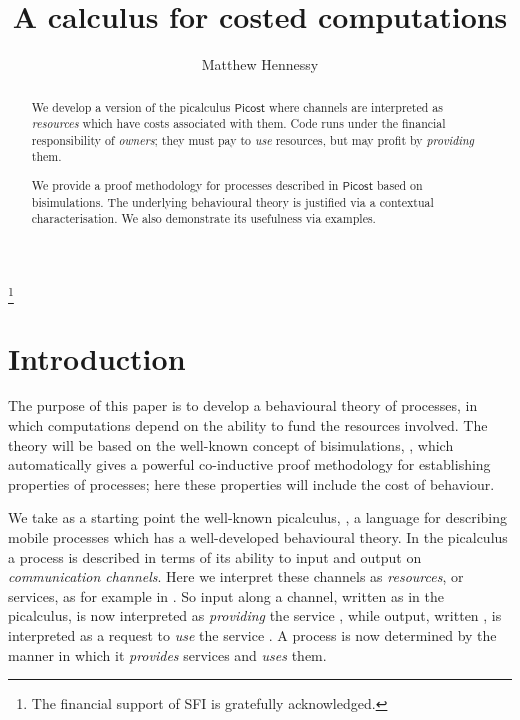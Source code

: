 \documentclass{LMCS}
\newcommand{\pfn}[1]{\mathsf{#1}}  \newcommand{\cfn}[1]{\mathsf{#1}}  \newcommand{\ownfnt}[1]{{\mathsf{#1}}}
\newcommand{\picost}{\ensuremath{\pfn{Picost}}\xspace}
\begin{document}
\title[costed computations]{A calculus for costed computations}

\author[M.~Hennessey]{Matthew Hennessy}


\address{Department of Computer Science\\ Trinity College Dublin\\
    Ireland} 

\thanks{The financial support of SFI is gratefully acknowledged.}







\begin{abstract}

We develop a version of the picalculus \picost where  
channels are interpreted as \emph{resources} which have 
costs associated with them. Code runs under the financial
responsibility of \emph{owners}; they   must pay to 
\emph{use} resources, but may profit by \emph{providing} 
them.

We provide a  proof methodology for processes described in \picost
based on bisimulations. The underlying  behavioural theory is justified
via a contextual characterisation. We also demonstrate its usefulness
via examples. 

\end{abstract}



\maketitle 


\section{Introduction}


The purpose of this paper is to develop a  behavioural
theory of processes, in which computations depend on the ability to
fund the resources involved. The theory will be based on the
well-known concept of bisimulations, \cite{pimilner}, which
automatically gives a powerful co-inductive proof methodology for
establishing properties of processes; here these properties will
include the cost of behaviour.



 We take as a starting point
the well-known picalculus, \cite{pibook,pimilner}, a language for
describing mobile processes which has a well-developed behavioural
theory. In the picalculus a process is described in terms of its
ability to input and output on \emph{communication channels}. Here we
interpret these channels as \emph{resources}, or services, as for
example in \cite{beppe}. So input along a channel, written as
 in the picalculus, is now interpreted as \emph{providing}
the service , while output, written , is interpreted as
a request to \emph{use} the service .  A process is now determined
by the manner in which it \emph{provides}  services and
\emph{uses} them.
   
\end{document}
